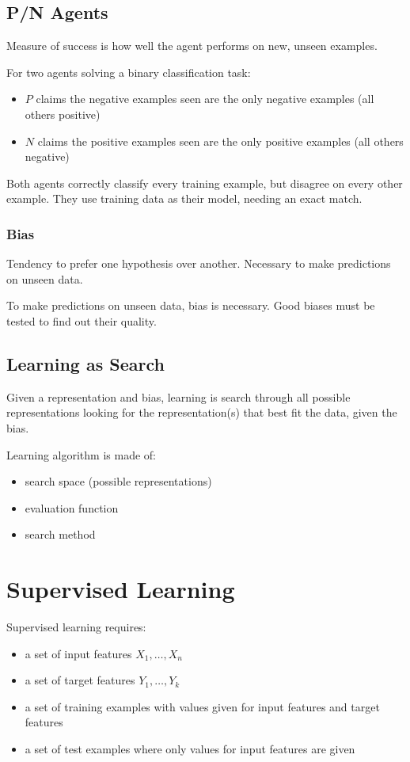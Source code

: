 \documentclass[11pt]{article}
\begin{document}
\subsection{P/N Agents}
\label{sec:org8da326e}
Measure of success is how well the agent performs on new, unseen examples.

For two agents solving a binary classification task:
\begin{itemize}
\item \(P\) claims the negative examples seen are the only negative examples (all others positive)
\item \(N\) claims the positive examples seen are the only positive examples (all others negative)
\end{itemize}

Both agents correctly classify every training example, but disagree on every other example.
They use training data as their model, needing an exact match.
\subsubsection{Bias}
\label{sec:org93cbd1a}
Tendency to prefer one hypothesis over another.
Necessary to make predictions on unseen data.

To make predictions on unseen data, bias is necessary.
Good biases must be tested to find out their quality.
\subsection{Learning as Search}
\label{sec:org101ea58}
Given a representation and bias, learning is search through all possible representations looking
for the representation(s) that best fit the data, given the bias.

Learning algorithm is made of:
\begin{itemize}
\item search space (possible representations)
\item evaluation function
\item search method
\end{itemize}
\section{Supervised Learning}
\label{sec:org7c88203}
Supervised learning requires:
\begin{itemize}
\item a set of input features \(X_{1}, \dots, X_{n}\)
\item a set of target features \(Y_{1}, \dots, Y_{k}\)
\item a set of training examples with values given for input features and target features
\item a set of test examples where only values for input features are given
\end{itemize}
\end{document}

